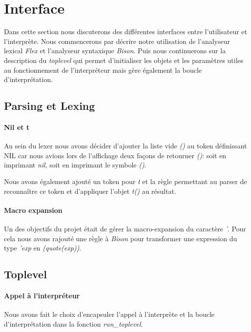 \section{Interface}
\label{sec:description}

Dans cette section nous discuterons des différentes interfaces entre
l'utilisateur et l'interprète.  Nous commencerons par décrire notre
utilisation de l'analyseur lexical \emph{Flex} et l'analyseur
syntaxique \emph{Bison}. Puis nous continuerons sur la description du
\emph{toplevel} qui permet d'initialiser les objets et les paramètres
utiles au fonctionnement de l'interpréteur mais gère également la
boucle d'interprétation.

\subsection{Parsing et Lexing}

\paragraph{Nil et t}
Au sein du lexer nous avons décider d'ajouter la liste vide \emph{()} au token
définissant NIL car nous avions lors de l'affichage deux façons de retourner
\emph{()}: soit en imprimant \emph{nil}, soit en imprimant le symbole
\emph{()}.

Nous avons également ajouté un token pour \emph{t}
et la règle permettant au parser de reconnaître ce
token et d'appliquer l'objet \emph{t()} au résultat.

\paragraph{Macro expansion}
Un des objectifs du projet était de gérer la macro-expansion du
caractère \emph{'}.  Pour cela nous avons rajouté une règle à
\emph{Bison} pour transformer une expression du type \emph{'exp} en
\emph{(quote(exp))}.

\subsection{Toplevel}

\paragraph{Appel à l'interpréteur}
Nous avons fait le choix d'encapsuler l'appel à l'interprète et la
boucle d'interprétation dans la fonction \emph{run\_toplevel}.


